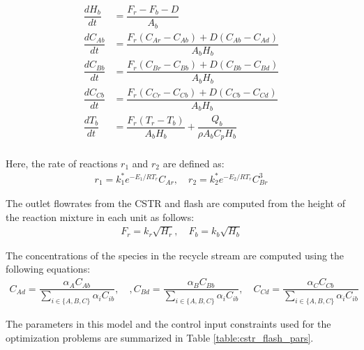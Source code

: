 \documentclass[10pt]{article}
\begin{document}
\begin{align*}
  \dfrac{dH_b}{dt} &= \dfrac{F_r - F_b - D}{A_b} \\
  \dfrac{dC_{Ab}}{dt} &= \dfrac{F_r(C_{Ar} -C_{Ab}) + 
                          D(C_{Ab} -C_{Ad})}{A_bH_b} \\
  \dfrac{dC_{Bb}}{dt} &= \dfrac{F_r(C_{Br} -C_{Bb}) + 
                          D(C_{Bb} -C_{Bd})}{A_bH_b} \\
  \dfrac{dC_{Cb}}{dt} &= \dfrac{F_r(C_{Cr} -C_{Cb}) + 
                          D(C_{Cb} -C_{Cd})}{A_bH_b} \\
  \dfrac{dT_b}{dt} &= \dfrac{F_r(T_r - T_b)}{A_bH_b} +
                      \dfrac{Q_b}{\rho A_b C_p H_b}\\
\end{align*}

Here, the rate of reactions $r_1$ and $r_2$ are defined as:
\begin{align*}
  r_1 = k_1^*e^{-E_1/RT_r}C_{Ar}, \quad r_2 = k_2^*e^{-E_2/RT_r}C_{Br}^3
\end{align*}

The outlet flowrates from the CSTR and flash are computed from the height of the reaction mixture in each unit as follows:
\begin{align*}
  F_r = k_r\sqrt{H_r}, \quad F_b = k_b\sqrt{H_b}
\end{align*}

The concentrations of the species in the recycle stream are computed using the following equations:
\begin{align*}
  C_{Ad} = \dfrac{\alpha_A C_{Ab}}{\sum_{i \in \{ A, B, C\}} \alpha_iC_{ib}} , \quad, C_{Bd} = \dfrac{\alpha_B C_{Bb}}{\sum_{i \in \{ A, B, C\}} \alpha_iC_{ib}}, \quad C_{Cd} = \dfrac{\alpha_C C_{Cb}}{\sum_{i \in \{ A, B, C\}} \alpha_iC_{ib}}
\end{align*}

The parameters in this model and the control input constraints used for the optimization problems are summarized in Table \ref{table:cstr_flash_pars}.
\end{document}
